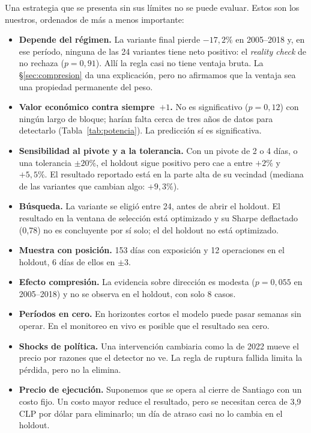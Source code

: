 \documentclass[10pt,a4paper]{article}
\begin{document}
Una estrategia que se presenta sin sus límites no se puede evaluar. Estos son los
nuestros, ordenados de más a menos importante:
\begin{itemize}
  \item \textbf{Depende del régimen.} La variante final pierde $-17{,}2\%$ en 2005--2018
        y, en ese período, ninguna de las 24 variantes tiene neto positivo: el
        \emph{reality check} de \citet{white2000} no rechaza ($p=0{,}91$). Allí la regla
        casi no tiene ventaja bruta. La §\ref{sec:compresion} da una explicación, pero no
        afirmamos que la ventaja sea una propiedad permanente del peso.
  \item \textbf{Valor económico contra siempre~$+1$.} No es significativo ($p=0{,}12$)
        con ningún largo de bloque; harían falta cerca de tres años de datos para
        detectarlo (Tabla~\ref{tab:potencia}). La predicción sí es significativa.
  \item \textbf{Sensibilidad al pivote y a la tolerancia.} Con un pivote de 2 o 4 días,
        o una tolerancia $\pm20\%$, el holdout sigue positivo pero cae a entre $+2\%$ y
        $+5{,}5\%$. El resultado reportado está en la parte alta de su vecindad (mediana
        de las variantes que cambian algo: $+9{,}3\%$).
  \item \textbf{Búsqueda.} La variante se eligió entre 24, antes de abrir el holdout. El
        resultado en la ventana de selección está optimizado y su Sharpe deflactado
        (0,78) no es concluyente por sí solo; el del holdout no está optimizado.
  \item \textbf{Muestra con posición.} 153 días con exposición y 12 operaciones en el
        holdout, 6 días de ellos en $\pm3$.
  \item \textbf{Efecto compresión.} La evidencia sobre dirección es modesta
        ($p=0{,}055$ en 2005--2018) y no se observa en el holdout, con solo 8 casos.
  \item \textbf{Períodos en cero.} En horizontes cortos el modelo puede pasar semanas
        sin operar. En el monitoreo en vivo es posible que el resultado sea cero.
  \item \textbf{Shocks de política.} Una intervención cambiaria como la de 2022 mueve el
        precio por razones que el detector no ve. La regla de ruptura fallida limita la
        pérdida, pero no la elimina.
  \item \textbf{Precio de ejecución.} Suponemos que se opera al cierre de Santiago con
        un costo fijo. Un costo mayor reduce el resultado, pero se necesitan cerca de 3,9
        CLP por dólar para eliminarlo; un día de atraso casi no lo cambia en el holdout.
\end{itemize}
\end{document}
